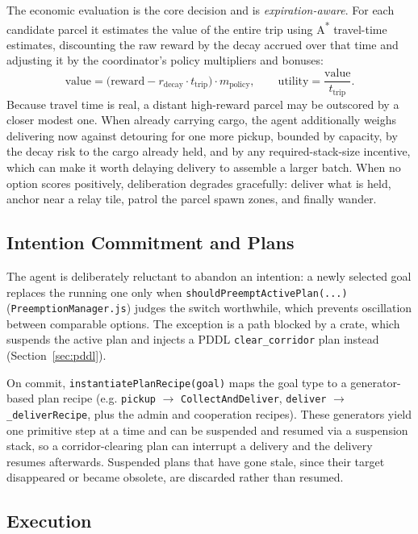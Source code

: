 \documentclass[a4paper,11pt]{article}
\begin{document}
The economic evaluation is the core decision and is \emph{expiration-aware}. For
each candidate parcel it estimates the value of the entire trip using A\textsuperscript{*}
travel-time estimates, discounting the raw reward by the decay accrued over that
time and adjusting it by the coordinator's policy multipliers and bonuses:
%
\begin{equation}
  \mathrm{value} = \bigl(\mathrm{reward} - r_{\text{decay}}\cdot t_{\text{trip}}\bigr)
                   \cdot m_{\text{policy}}, \qquad
  \mathrm{utility} = \frac{\mathrm{value}}{t_{\text{trip}}}.
\end{equation}
%
Because travel time is real, a distant high-reward parcel may be outscored by a
closer modest one. When already carrying cargo, the agent additionally weighs
delivering now against detouring for one more pickup, bounded by capacity, by the
decay risk to the cargo already held, and by any required-stack-size incentive, 
which can make it worth delaying delivery to assemble a larger batch. When no
option scores positively, deliberation degrades gracefully: deliver what is held,
anchor near a relay tile, patrol the parcel spawn zones, and finally wander.

\subsection{Intention Commitment and Plans}

The agent is deliberately reluctant to abandon an intention: a newly selected goal
replaces the running one only when \texttt{shouldPreemptActivePlan(...)}
(\texttt{PreemptionManager.js}) judges the switch worthwhile, which prevents
oscillation between comparable options. The exception is a path blocked by a crate,
which suspends the active plan and injects a PDDL \texttt{clear\_corridor} plan
instead (Section~\ref{sec:pddl}).

On commit, \texttt{instantiatePlanRecipe(goal)} maps the goal type to a
generator-based plan recipe (e.g. \texttt{pickup} $\to$ \texttt{CollectAndDeliver},
\texttt{deliver} $\to$ \texttt{\_deliverRecipe}, plus the admin and cooperation
recipes). These generators yield one primitive step at a time and can be suspended
and resumed via a suspension stack, so a corridor-clearing plan can interrupt a
delivery and the delivery resumes afterwards. Suspended plans that have gone stale, since 
their target disappeared or became obsolete, are discarded rather than resumed.

\subsection{Execution}
\end{document}
